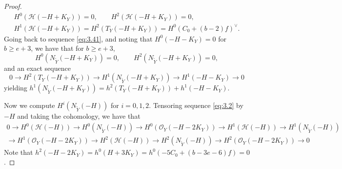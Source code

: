\documentclass[11pt,twoside]{amsart}
\theoremstyle{plain}
\theoremstyle{definition}
\newcommand{\OO}{\mathcal{O}}
\newcommand{\Yt}{\widetilde{Y}}
\newcommand{\NYt}{N_{\Yt}}
\newcommand{\Hc}{\mathcal{H}}
\begin{document}
\begin{proof}
\begin{equation}
\begin{gathered}
H^0(\Hc(-H+K_Y))=0,\qquad H^2(\Hc(-H+K_Y))=0,\\
H^1(\Hc(-H+K_Y))=H^2(T_Y(-H+K_Y))=H^0(C_0+(b-2)f)^{\vee}.
\end{gathered}
\end{equation}
Going back to sequence \eqref{eq:3.41}, and noting that $H^0(-H-K_Y)=0$ for $b\ge e+3$, we have that for $b\ge e+3$,
\begin{equation}\label{eq:3.49}
H^0(\NYt(-H+K_Y))=0,\qquad H^2(\NYt(-H+K_Y))=0,
\end{equation}
and an exact sequence
\begin{equation}\label{eq:3.50}
0\to H^2(T_Y(-H+K_Y))\to H^1(\NYt(-H+K_Y))\to H^1(-H-K_Y)\to 0
\end{equation}
yielding $h^1(\NYt(-H+K_Y))=h^2(T_Y(-H+K_Y))+h^1(-H-K_Y)$.

Now we compute $H^i(\NYt(-H))$ for $i=0,1,2$. Tensoring sequence \eqref{eq:3.2} by $-H$ and taking the cohomology, we have that
\begin{multline}\label{eq:3.51}
0\to H^0(\Hc(-H))\to H^0(\NYt(-H))\to H^0(\OO_Y(-H-2K_Y))\to H^1(\Hc(-H))\to H^1(\NYt(-H))\\
\to H^1(\OO_Y(-H-2K_Y))\to H^2(\Hc(-H))\to H^2(\NYt(-H))\to H^2(\OO_Y(-H-2K_Y))\to 0
\end{multline}
Note that $h^2(-H-2K_Y)=h^0(H+3K_Y)=h^0(-5C_0+(b-3e-6)f)=0$. %


\end{proof}
\end{document}
